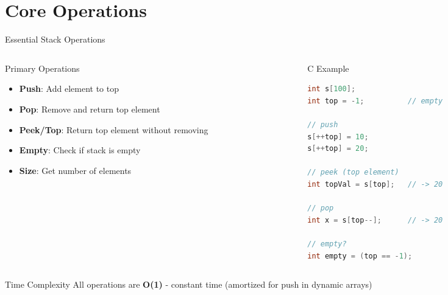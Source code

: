 \documentclass[aspectratio=169,xcolor=dvipsnames]{beamer}
\begin{document}
\section{Core Operations}

\begin{frame}[fragile]{Essential Stack Operations}
  \begin{columns}
    \begin{column}{0.5\textwidth}
      \begin{block}{Primary Operations}
        \begin{itemize}
          \item \textbf{Push}: Add element to top
          \item \textbf{Pop}: Remove and return top element
          \item \textbf{Peek/Top}: Return top element without removing
          \item \textbf{Empty}: Check if stack is empty
          \item \textbf{Size}: Get number of elements
        \end{itemize}
      \end{block}
    \end{column}
    \begin{column}{0.45\textwidth}
      \begin{exampleblock}{C Example}
        \begin{lstlisting}[language=C,basicstyle=\tiny\ttfamily]
int s[100];
int top = -1;          // empty

// push
s[++top] = 10;
s[++top] = 20;

// peek (top element)
int topVal = s[top];   // -> 20

// pop
int x = s[top--];      // -> 20

// empty?
int empty = (top == -1);
        \end{lstlisting}
      \end{exampleblock}
    \end{column}
  \end{columns}
  
  \vspace{0.5cm}
  
  \begin{alertblock}{Time Complexity}
    All operations are \textbf{O(1)} - constant time (amortized for push in dynamic arrays)
  \end{alertblock}
\end{frame}
\end{document}
